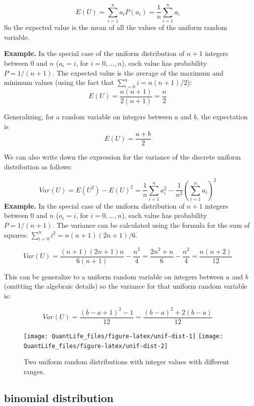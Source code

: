 \documentclass[
]{book}
\theoremstyle{definition}
\theoremstyle{definition}
\theoremstyle{definition}
\theoremstyle{remark}
\begin{document}
\[
E(U) = \sum_{i=1}^n  a_i P(a_i) = \frac{1}{n}  \sum_{i=1}^n  a_i 
\]
So the expected value is the mean of all the values of the uniform random variable.

\textbf{Example.} In the special case of the uniform distribution of \(n+1\) integers between 0 and \(n\) (\(a_i = i\), for \(i=0,..., n\)), each value has probability \(P = 1/(n+1)\). The expected value is the average of the maximum and minimum values (using the fact that \(\sum_{i=0}^n i = n(n+1)/2\)):
\[ E(U) = \frac{n(n+1)}{2(n+1)} = \frac{n}{2} \]

Generalizing, for a random variable on integers between \(a\) and \(b\), the expectation is
\[ E(U) = \frac{a+b}{2}\]

We can also write down the expression for the variance of the discrete uniform distribution as follows:

\[ Var(U) = E(U^2) - E(U)^2 =  \frac{1}{n} \sum_{i=1}^n  a_i^2  -  \frac{1}{n^2} \left(\sum_{i=1}^n  a_i \right)^2\]
\textbf{Example.} In the special case of the uniform distribution of \(n+1\) integers between 0 and \(n\) (\(a_i = i\), for \(i=0,..., n\)), each value has probability \(P = 1/(n+1)\). The variance can be calculated using the formula for the sum of squares:
\(\sum_{i=0}^n i^2 =n(n+1)(2n+1)/6\).

\[ Var(U) = \frac{(n+1)(2n+1)n}{6(n+1)} - \frac{n^2}{4} =   \frac{2n^2+n}{6} - \frac{n^2}{4} = \frac{n(n+2)}{12}
\]

This can be generalize to a uniform random variable on integers between \(a\) and \(b\) (omitting the algebraic details) so the variance for that uniform random variable is:

\[ Var(U) = \frac{(b-a+1)^2 - 1}{12} = \frac{(b-a)^2 + 2(b-a)}{12}
\]

\begin{figure}

{\centering \texttt{[image: QuantLife\_files/figure-latex/unif-dist-1]} \texttt{[image: QuantLife\_files/figure-latex/unif-dist-2]} 

}

\caption{Two uniform random distributions with integer values with different ranges.}\label{fig:unif-dist}
\end{figure}

\hypertarget{binomial-distribution}{%
\subsection{binomial distribution}\label{binomial-distribution}}
\end{document}
